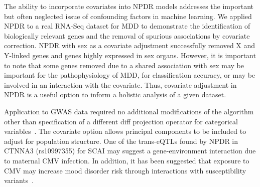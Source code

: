 \documentclass{bioinfo}
\begin{document}

The ability to incorporate covariates into NPDR models addresses the important but often neglected issue of confounding factors in machine learning.
We applied NPDR to a real RNA-Seq dataset for MDD to demonstrate the identification of biologically relevant genes and the removal of spurious associations by covariate correction.
NPDR with sex as a covariate adjustment successfully removed X and Y-linked genes and genes highly expressed in sex organs.
However, it is important to note that some genes removed due to a shared association with sex may be important for the pathophysiology of MDD, for classification accuracy, or may be involved in an interaction with the covariate.
Thus, covariate adjustment in NPDR is a useful option to inform a holistic analysis of a given dataset.

Application to GWAS data required no additional modifications of the algorithm other than specification of a different diff projection operator for categorical variables~\citep{titv}. The covariate option allows principal components to be included to adjust for population structure.
One of the trans-eQTLs found by NPDR in CTNNA3 (rs10997355) for SCAI may suggest a gene-environment interaction due to maternal CMV infection.
In addition, it has been suggested that exposure to CMV may increase mood disorder risk through interactions with susceptibility variants~\citep{kim2007exposure}.
\end{document}
